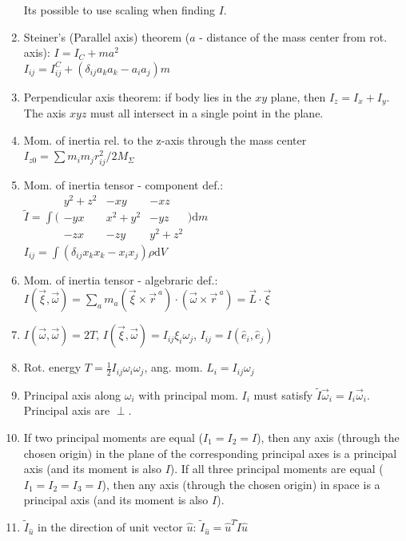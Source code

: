 \documentclass{article}
\renewcommand\d{\mathrm d}
\begin{document}
\begin{multicols}{3}
\begin{enumerate}
            Its possible to use scaling when finding $I$.
        \item Steiner's (Parallel axis) theorem ($a$ - distance of the mass center from rot. axis): $I=I_C+ma^2$\\
            $I_{ij}=I^C_{ij}+(\delta_{ij}a_ka_k-a_ia_j)m$
        \item Perpendicular axis theorem: if body lies in the $xy$ plane, then $I_z=I_x+I_y$. The axis $xyz$ must all intersect in a single point in the plane.
        \item Mom. of inertia rel. to the z-axis through the mass center $I_{z0} = \sum m_i m_j r_{ij}^2/2M_\Sigma$
        \item Mom. of inertia tensor - component def.:\\
            $\tilde I=\int\Bigg(
            \begin{matrix}
                y^2+z^2 & -xy & -xz\\
                -yx & x^2+y^2 & -yz\\
                -zx & -zy & y^2+z^2
            \end{matrix}
            \Bigg)\d m$\\
            $I_{ij}=\int\left(\delta_{ij}x_kx_k-x_ix_j\right)\rho\d V$
        \item Mom. of inertia tensor - algebraric def.:\\
            $I(\vec\xi,\vec\omega)=\sum_am_a(\vec\xi\times\vec r^{~a})\cdot(\vec\omega\times\vec r^{~a})=\vec L\cdot\vec\xi$
        \item $I(\vec\omega,\vec\omega)=2T$, $I(\vec\xi,\vec\omega)=I_{ij}\xi_i\omega_j$, $I_{ij}=I(\hat e_i,\hat e_j)$
        \item Rot. energy $T=\frac{1}{2}I_{ij}\omega_i\omega_j$, ang. mom. $L_i=I_{ij}\omega_j$
        \item Principal axis along $\omega_i$ with principal mom. $I_i$ must satisfy $\tilde I\vec\omega_i=I_i\vec\omega_i$. Principal axis are $\perp$.
        \item If two principal moments are equal ($I_1=I_2=I$), then any axis (through the chosen origin) in the plane of the corresponding principal axes is a principal axis (and its moment is also $I$). If all three principal moments are equal ($I_1=I_2=I_3=I$), then any axis (through the chosen origin) in space is a principal axis (and its moment is also $I$).
        \item $\tilde I_{\hat u}$ in the direction of unit vector $\hat u$: $\tilde I_{\hat u}=\hat u^T\tilde I\hat u$\\

\end{enumerate}
\end{multicols}
\end{document}
